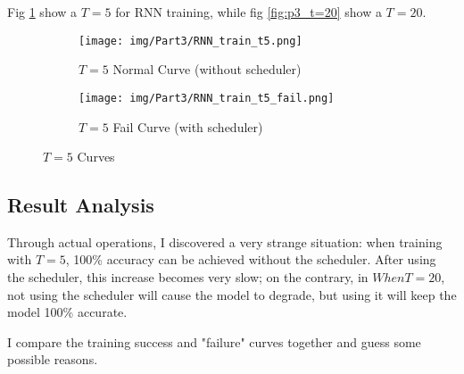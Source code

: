 Fig \ref{fig:p3_t=5} show a $T=5$ for RNN training, while fig \ref{fig:p3_t=20} show a $T=20$.

\begin{figure}[!htbp]
  \centering
  \begin{subfigure}[b]{1\textwidth}
    \texttt{[image: img/Part3/RNN\_train\_t5.png]}
    \caption{$T=5$ Normal Curve (without scheduler)}
  \end{subfigure}
  \begin{subfigure}[b]{1\textwidth}
    \texttt{[image: img/Part3/RNN\_train\_t5\_fail.png]}
    \caption{$T=5$ Fail Curve (with scheduler)}
  \end{subfigure}
  \caption{$T=5$ Curves}
  \label{fig:p3_t=5}
\end{figure}

\subsection{Result Analysis}

Through actual operations, I discovered a very strange situation: when training with $T=5$, 100\% accuracy can be achieved without the scheduler.
After using the scheduler, this increase becomes very slow; on the contrary, in $ When T=20$, not using the scheduler will cause the model to degrade, but using it will keep the model 100\% accurate.

I compare the training success and "failure" curves together and guess some possible reasons.

